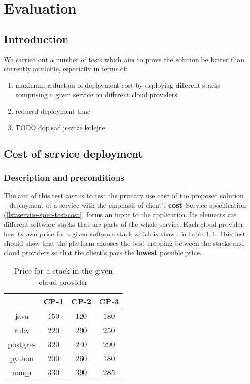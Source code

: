 \chapter{Evaluation}


\section{Introduction}
We carried out a number of tests which aim to prove the solution be better than currently available, especially in terms of:
\begin{enumerate}
  \item maximum reduction of deployment cost by deploying different stacks comprising a given service on different cloud providers
  \item reduced deployment time
  \item TODO dopisać jeszcze kolejne
\end{enumerate}

\section{Cost of service deployment}
\subsection{Description and preconditions}
The aim of this test case is to test the primary use case of the proposed solution -- deployment of a service with the emphasis of client's \textbf{cost}.
Service specification (\ref{lst:service-spec-test-cost}) forms an input to the application. Its elements are different software stacks that are parts of the whole service. Each cloud provider has its own price for a given software stack which is shown in table \ref{tbl:test-service-deployment-cost}.
This test should show that the platform chooses the best mapping between the stacks and cloud providers so that the client's pays the \textbf{lowest} possible price.

\begin{table}
  \centering
  \begin{tabular}{ | c | c | c | c | }
    \hline                        
    & CP-1 & CP-2 & CP-3 \\
    \hline
    java      & 150 & 120 & 180 \\
    ruby      & 220 & 290 & 250 \\
    postgres  & 320 & 240 & 290 \\
    python    & 200 & 260 & 180 \\
    amqp      & 330 & 390 & 285 \\
    \hline  
  \end{tabular}
  \caption{Price for a stack in the given cloud provider}
  \label{tbl:test-service-deployment-cost}
\end{table}

